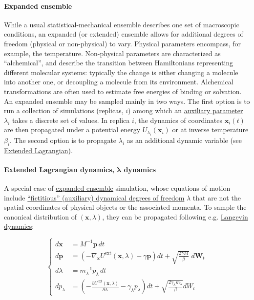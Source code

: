 \documentclass[9pt,review]{livecoms}
\newcommand{\vx}{\mathbf{x}}
\newcommand{\vp}{\mathbf{p}}
\begin{document}
\hypertarget{ref:ExpEns} {\paragraph{Expanded ensemble}}
While a usual statistical-mechanical ensemble describes one set of macroscopic conditions, an expanded (or extended) ensemble allows for additional degrees of freedom (physical or non-physical) to vary. Physical parameters encompass, for example, the temperature. Non-physical parameters are characterized as ``alchemical'', and describe the transition between Hamiltonians representing different molecular systems: typically the change is either changing a molecule into another one, or decoupling a molecule from its environment.
Alchemical transformations are often used to estimate free energies of binding or solvation.
An expanded ensemble may be sampled mainly in two ways.
The first option is to run a collection of simulations (replicas, $i$) among which an \hyperlink{ref:AuxVar} {auxiliary parameter} $\lambda_i$ takes a discrete set of values.
In replica $i$, the dynamics of coordinates $\vx_i(t)$ are then propagated under a potential energy $U_{\lambda_i}(\vx_i)$ or at inverse temperature $\beta_i$.
The second option is to propagate $\lambda_i$ as an additional dynamic variable (see \hyperlink{ref:ExtL} {Extended Lagrangian}).

\hypertarget{ref:ExtL} {\paragraph{Extended Lagrangian dynamics, $\boldsymbol\lambda$ dynamics}}
A special case of \hyperlink{ref:ExpEns} {expanded ensemble} simulation, whose equations of motion include \hyperlink{ref:AuxVar} {``fictitious'' (auxiliary) dynamical degrees of freedom} $\lambda$ that are not the spatial coordinates of physical objects or the associated momenta.
To sample the canonical distribution of $(\vx, \lambda)$, they can be propagated following e.g. \hyperlink{ref:Langevin} {Langevin dynamics}:

\begin{equation}
\left\{
\begin{array}{ll}
d\vx &= M^{-1} \vp \, dt\\
d\vp &= \left(-\nabla_\vx U^\text{ext}(\vx,  \lambda) - \gamma \vp \right) dt
    + \sqrt{ \frac{2 \gamma M}{\beta}} \; d\mathbf{W}_t\\
d\lambda &= m_\lambda^{-1} p_\lambda \, dt \\
dp_\lambda &= \left(-\frac{\partial U^\text{ext}(\vx, \lambda)}{\partial \lambda} - \gamma_\lambda p_\lambda \right) dt
    + \sqrt{ \frac{2 \gamma_\lambda m_\lambda}{ \beta }} dW_t
\end{array}
\right.
\end{equation}
\end{document}
